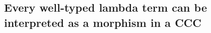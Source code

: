 \subsection{Every well-typed lambda term can be interpreted as a morphism in a CCC}
\label{sec:co_t2m}